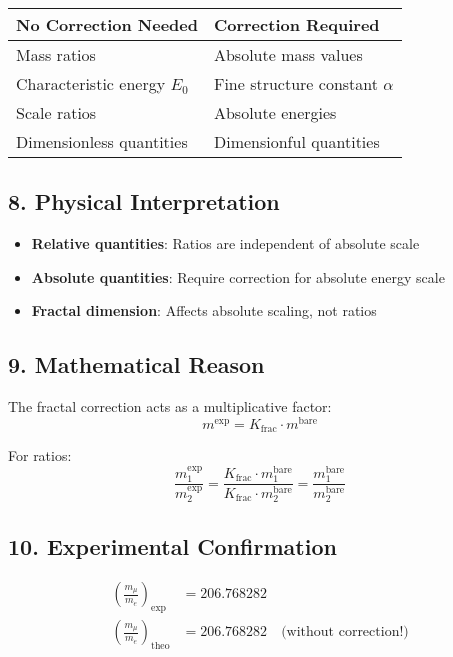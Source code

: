 \documentclass[12pt,a4paper]{article}
\theoremstyle{definition}
\begin{document}
\begin{tabular}{p{}p{}}
	\textbf{No Correction Needed} & \textbf{Correction Required} \\
	\hline
	Mass ratios & Absolute mass values \\
	Characteristic energy $E_0$ & Fine structure constant $\alpha$ \\
	Scale ratios & Absolute energies \\
	Dimensionless quantities & Dimensionful quantities \\
\end{tabular}

\subsection*{8. Physical Interpretation}

\begin{itemize}
	\item \textbf{Relative quantities}: Ratios are independent of absolute scale
	\item \textbf{Absolute quantities}: Require correction for absolute energy scale
	\item \textbf{Fractal dimension}: Affects absolute scaling, not ratios
\end{itemize}

\subsection*{9. Mathematical Reason}

The fractal correction acts as a multiplicative factor:
\[
m^{\text{exp}} = K_{\text{frac}} \cdot m^{\text{bare}}
\]

For ratios:
\[
\frac{m_1^{\text{exp}}}{m_2^{\text{exp}}} = \frac{K_{\text{frac}} \cdot m_1^{\text{bare}}}{K_{\text{frac}} \cdot m_2^{\text{bare}}} = \frac{m_1^{\text{bare}}}{m_2^{\text{bare}}}
\]

\subsection*{10. Experimental Confirmation}

\begin{align*}
	\left(\frac{m_\mu}{m_e}\right)_{\text{exp}} &= 206.768282 \\
	\left(\frac{m_\mu}{m_e}\right)_{\text{theo}} &= 206.768282 \quad \text{(without correction!)}
\end{align*}
\end{document}
